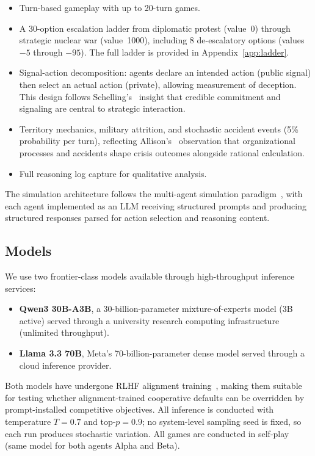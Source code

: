 \documentclass[manuscript, review=true, anonymous=true]{acmart}
\begin{document}
\begin{itemize}
  \item Turn-based gameplay with up to 20-turn games.
  \item A 30-option escalation ladder from diplomatic protest (value~0) through strategic nuclear war (value~1000), including 8 de-escalatory options (values $-5$ through $-95$). The full ladder is provided in Appendix~\ref{app:ladder}.
  \item Signal-action decomposition: agents declare an intended action (public signal) then select an actual action (private), allowing measurement of deception.
  This design follows Schelling's~\cite{schelling1960strategy} insight that credible commitment and signaling are central to strategic interaction.
  \item Territory mechanics, military attrition, and stochastic accident events (5\% probability per turn), reflecting Allison's~\cite{allison1971essence} observation that organizational processes and accidents shape crisis outcomes alongside rational calculation.
  \item Full reasoning log capture for qualitative analysis.
\end{itemize}

The simulation architecture follows the multi-agent simulation paradigm~\cite{epstein2006generative,guo2024large}, with each agent implemented as an LLM receiving structured prompts and producing structured responses parsed for action selection and reasoning content.

\subsection{Models}

We use two frontier-class models available through high-throughput inference services:

\begin{itemize}
  \item \textbf{Qwen3 30B-A3B}, a 30-billion-parameter mixture-of-experts model (3B active) served through a university research computing infrastructure (unlimited throughput).
  \item \textbf{Llama 3.3 70B}, Meta's 70-billion-parameter dense model served through a cloud inference provider.
\end{itemize}

Both models have undergone RLHF alignment training~\cite{ouyang2022training}, making them suitable for testing whether alignment-trained cooperative defaults can be overridden by prompt-installed competitive objectives.
All inference is conducted with temperature $T = 0.7$ and top-$p = 0.9$; no system-level sampling seed is fixed, so each run produces stochastic variation.
All games are conducted in self-play (same model for both agents Alpha and Beta).
\end{document}
